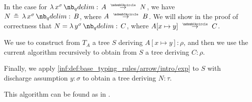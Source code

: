 \begin{algorithm}
\begin{thmenum}
\begin{thmenum}
       In the case  for \( \qabs {x^\sigma} A \pred N \), we have \( N \aequiv \qabs {x^\sigma} B \), where \( A \pred B \). We will show in the proof of correctness that \( N = \qabs {y^\sigma} C \), where \( A[x \mapsto y] \pred C \).

      We use  to construct from \( T_A \) a tree \( S \) deriving \( A[x \mapsto y]: \rho \), and then we use the current algorithm recursively to obtain from \( S \) a tree deriving \( C: \rho \).

      Finally, we apply \ref{inf:def:base_typing_rules/arrow/intro/exp} to \( S \) with discharge assumption \( y: \sigma \) to obtain a tree deriving \( N: \tau \).
    \end{thmenum}
  \end{thmenum}
\end{algorithm}
\begin{comments}
  \item This algorithm can be found as  in \cite{notebook:code}.
\end{comments}
